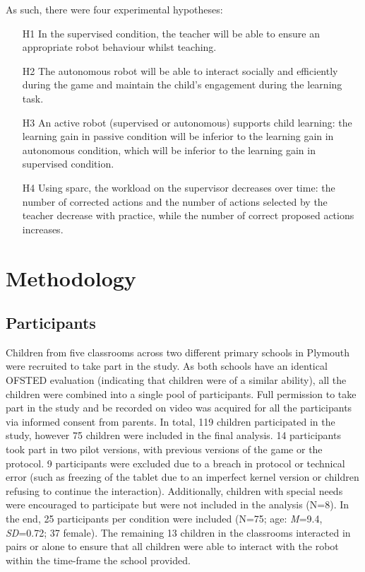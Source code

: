 As such, there were four experimental hypotheses:
\begin{itemize}
	\item [H1] In the supervised condition, the teacher will be able to ensure an appropriate robot behaviour whilst teaching.
	\item [H2] The autonomous robot will be able to interact socially and efficiently during the game and maintain the child's engagement during the learning task.
	\item [H3] An active robot (supervised or autonomous) supports child learning: the learning gain in passive condition will be inferior to the learning gain in autonomous condition, which will be inferior to the learning gain in supervised condition.
	\item [H4] Using \gls{sparc}, the workload on the supervisor decreases over time: the number of corrected actions and the number of actions selected  by the teacher decrease with practice, while the number of correct proposed actions increases.
\end{itemize}

\section{Methodology}

\subsection{Participants}

Children from five classrooms across two different primary schools in Plymouth were recruited to take part in the study. As both schools have an identical OFSTED evaluation (indicating that children were of a similar ability), all the children were combined into a single pool of participants. Full permission to take part in the study and be recorded on video was acquired for all the participants via informed consent from parents. In total, 119 children participated in the study, however 75 children were included in the final analysis. 14 participants took part in two pilot versions, with previous versions of the game or the protocol. 9 participants were excluded due to a breach in protocol or technical error (such as freezing of the tablet due to an imperfect kernel version or children refusing to continue the interaction). Additionally, children with special needs were encouraged to participate but were not included in the analysis (N=8). In the end, 25 participants per condition were included (N=75; age: \textit{M}=9.4, \textit{SD}=0.72; 37 female). The remaining 13 children in the classrooms interacted in pairs or alone to ensure that all children were able to interact with the robot within the time-frame the school provided. 

